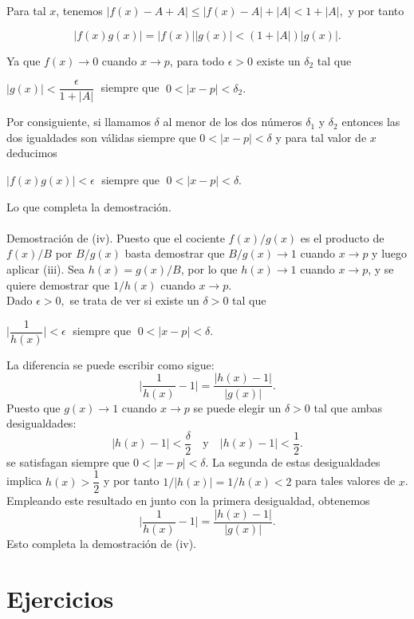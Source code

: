 Para tal $x$, tenemos $|f(x)-A+A|\leq |f(x)-A|+|A|<1+|A|,$ y por tanto

$$|f(x)g(x)|=|f(x)||g(x)|<(1+|A|)|g(x)|.$$

Ya que $f(x)\to 0$ cuando $x\to p$, para todo $\epsilon > 0$ existe un $\delta_2$ tal que 

\begin{center}
$|g(x)|<\dfrac{\epsilon}{1+|A|}\;$ siempre que $\; 0<|x-p|<\delta_2.$
\end{center}

Por consiguiente, si llamamos $\delta$ al menor de los dos números $\delta_1$ y $\delta_2$ entonces las dos igualdades son válidas siempre que $0<|x-p|<\delta$ y para tal valor de $x$ deducimos 

\begin{center}
$|f(x)g(x)|<\epsilon\;$ siempre que $\;0<|x-p|<\delta.$
\end{center}

Lo que completa la demostración.\\\\

Demostración de (iv). Puesto que el cociente $f(x)/g(x)$ es el producto de $f(x)/B$ por $B/g(x)$ basta demostrar que $B/g(x)\to 1$ cuando $x\to p$ y luego aplicar (iii). Sea $h(x)=g(x)/B$, por lo que $h(x)\to 1$ cuando $x\to p$, y se quiere demostrar que $1/h(x)$ cuando $x\to p$.\\
Dado $\epsilon>0,$ se trata de ver si existe un $\delta>0$ tal que
\begin{center}
$\bigg|\dfrac{1}{h(x)}\bigg|<\epsilon\;$ siempre que $\; 0<|x-p|<\delta.$
\end{center}
La diferencia se puede escribir como sigue:
$$\bigg|\dfrac{1}{h(x)}-1\bigg|=\dfrac{|h(x)-1|}{|g(x)|}.$$
Puesto que $g(x)\to 1$ cuando $x\to p$ se puede elegir un $\delta>0$ tal que ambas desigualdades:
$$|h(x)-1|<\dfrac{\delta}{2}\quad \mbox{y}\quad |h(x)-1|<\dfrac{1}{2}.$$
se satisfagan siempre que $0<|x-p|<\delta$. La segunda de estas desigualdades implica $h(x)>\dfrac{1}{2}$ y por tanto $1/|h(x)|=1/h(x)<2$ para tales valores de $x$. Empleando este resultado en junto con la primera desigualdad, obtenemos 
$$\bigg|\dfrac{1}{h(x)}-1\bigg|=\dfrac{|h(x)-1|}{|g(x)|}.$$
Esto completa la demostración de (iv).\\

\section{Ejercicios}

